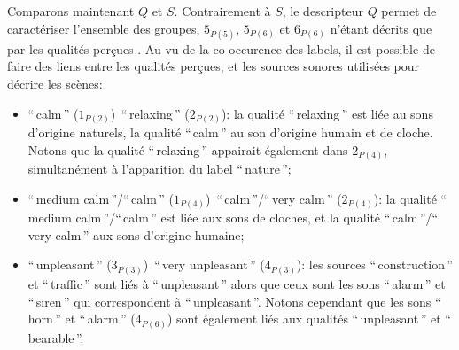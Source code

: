 Comparons maintenant $Q$ et $S$. Contrairement à $S$, le descripteur $Q$ permet de caractériser l'ensemble des groupes,  $5_{P(5)}$,  $5_{P(6)}$ et  $6_{P(6)}$ n'étant décrits que par les qualités perçues . Au vu de la co-occurence des labels, il est possible de faire des liens entre les qualités perçues, et les sources sonores utilisées pour décrire les scènes:

\begin{itemize}
\item ``\,calm\,'' ($1_{P(2)}$)~\vs ``\,relaxing\,'' ($2_{P(2)}$): la qualité ``\,relaxing\,'' est liée au sons d'origine naturels, la qualité ``\,calm\,'' au son d'origine humain et de cloche. Notons que la qualité ``\,relaxing\,'' appairait également dans $2_{P(4)}$, simultanément à l'apparition du label ``\,nature\,'';
\item ``\,medium calm\,''/``\,calm\,'' ($1_{P(4)}$)~\vs ``\,calm\,''/``\,very calm\,'' ($2_{P(4)}$): la qualité ``\,medium calm\,''/``\,calm\,'' est liée aux sons de cloches, et la qualité ``\,calm\,''/``\,very calm\,'' aux sons d'origine humaine;
\item ``\,unpleasant\,'' ($3_{P(3)}$)~\vs ``\,very unpleasant\,'' ($4_{P(3)}$): les sources ``\,construction\,'' et ``\,traffic\,'' sont liés à ``\,unpleasant\,'' alors que ceux sont les sons ``\,alarm\,'' et ``\,siren\,'' qui correspondent à ``\,unpleasant\,''. Notons cependant que les sons ``\,horn\,'' et ``\,alarm\,'' ($4_{P(6)}$) sont également liés aux qualités ``\,unpleasant\,'' et ``\,bearable\,''.
\end{itemize}



